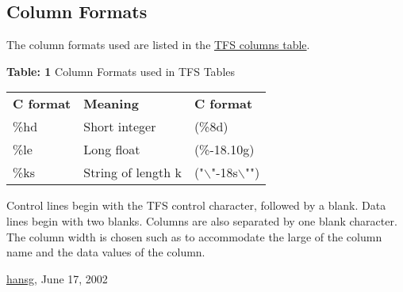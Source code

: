 




\subsection{Column Formats}
  The column formats used are listed in the  \hyperlink{table}{TFS columns table}. 

\begin{center}
\begin{table}[H]
{\textbf{Table: 1} Column Formats used in TFS Tables}
\\
\begin{tabular}{l l l}
\textbf{C format} & \textbf{Meaning} & \textbf{C format} \\ 
\%hd & Short integer & (\%8d) \\ 
\%le & Long float & (\%-18.10g) \\ 
\%ks & String of length k & ("$\backslash$"-18s$\backslash$"")
\end{tabular}
\end{table}
\end{center}

 Control lines begin with the TFS control character, followed by a blank. Data lines begin with two blanks. Columns are also separated by one blank character. The column width is chosen such as to accommodate the large of the column name and the data values of the column. 

\href{http://www.cern.ch/Hans.Grote/hansg_sign.html}{hansg}, June 17, 2002 

